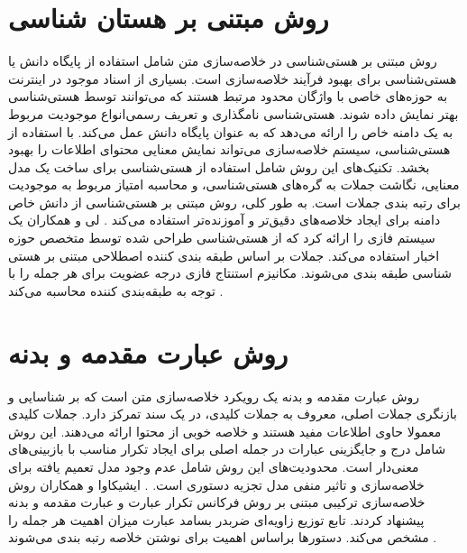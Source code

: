 \section{روش مبتنی بر هستان شناسی}
روش مبتنی بر هستی‌شناسی در خلاصه‌سازی متن شامل استفاده از پایگاه دانش یا هستی‌شناسی برای بهبود فرآیند خلاصه‌سازی است. بسیاری از اسناد موجود در اینترنت به حوزه‌های خاصی با واژگان محدود مرتبط هستند که می‌توانند توسط هستی‌شناسی بهتر نمایش داده شوند. هستی‌شناسی نامگذاری و تعریف رسمی‌انواع موجودیت مربوط به یک دامنه خاص را ارائه می‌دهد که به عنوان پایگاه دانش عمل می‌کند. با استفاده از هستی‌شناسی، سیستم خلاصه‌سازی می‌تواند نمایش معنایی محتوای اطلاعات را بهبود بخشد. تکنیک‌های این روش شامل استفاده از هستی‌شناسی برای ساخت یک مدل معنایی، نگاشت جملات به گره‌های هستی‌شناسی، و محاسبه امتیاز مربوط به موجودیت برای رتبه بندی جملات است. به طور کلی، روش مبتنی بر هستی‌شناسی از دانش خاص دامنه برای ایجاد خلاصه‌های دقیق‌تر و آموزنده‌تر استفاده می‌کند
\cite{andhale2016overview}.
لی و همکاران  یک سیستم فازی را ارائه کرد که از هستی‌شناسی طراحی شده توسط متخصص حوزه اخبار استفاده می‌کند. جملات بر اساس طبقه بندی کننده اصطلاحی مبتنی بر هستی شناسی طبقه بندی می‌شوند. مکانیزم استنتاج فازی درجه عضویت برای هر جمله را با توجه به طبقه‌بندی کننده محاسبه می‌کند
\cite{lee2005fuzzy}.

\section{روش  عبارت مقدمه و بدنه}

روش عبارت مقدمه و بدنه یک رویکرد خلاصه‌سازی متن است که بر شناسایی و بازنگری جملات اصلی، معروف به جملات کلیدی، در یک سند تمرکز دارد. جملات کلیدی معمولا حاوی اطلاعات مفید هستند و خلاصه خوبی از محتوا ارائه می‌دهند. این روش شامل درج و جایگزینی عبارات در جمله اصلی برای ایجاد تکرار مناسب با بازبینی‌های معنی‌دار است. محدودیت‌های این روش شامل عدم وجود مدل تعمیم یافته برای خلاصه‌سازی و تاثیر منفی مدل تجزیه دستوری است.
\cite{andhale2016overview}.
ایشیکاوا و همکاران  روش خلاصه‌سازی ترکیبی مبتنی بر روش فرکانس تکرار عبارت
 و عبارت مقدمه و بدنه پیشنهاد کردند. تابع توزیع زاویه‌ای ضربدر بسامد عبارت  میزان اهمیت هر جمله را مشخص می‌کند. دستورها براساس اهمیت برای نوشتن خلاصه رتبه بندی می‌شوند
\cite{Ishikawa2001HybridTS}.

